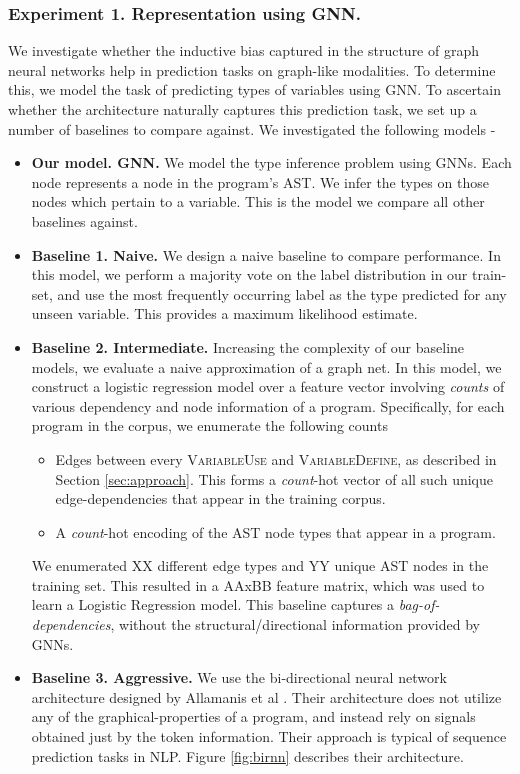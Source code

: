 \subsubsection{Experiment 1. Representation using GNN.}
We investigate whether the inductive bias captured in the structure of graph neural networks help in prediction tasks on graph-like modalities. To determine this, we model the task of predicting types of variables using GNN. To ascertain whether the architecture naturally captures this prediction task, we set up a number of baselines to compare against. We investigated the following models -
\begin{itemize}[noitemsep,topsep=0pt]
	\item \textbf{Our model. GNN.} We model the type inference problem using GNNs. Each node represents a node in the program's AST. We infer the types on those nodes which pertain to a variable. This is the model we compare all other baselines against.
	\item \textbf{Baseline 1. Naive.} We design a naive baseline to compare performance. In this model, we perform a majority vote on the label distribution in our train-set, and use the most frequently occurring label as the type predicted for any unseen variable. This provides a maximum likelihood estimate.
	\item \textbf{Baseline 2. Intermediate.} Increasing the complexity of our baseline models, we evaluate a naive approximation of a graph net. In this model, we construct a logistic regression model over a feature vector involving \textit{counts} of various dependency and node information of a program. Specifically, for each program in the corpus, we enumerate the following counts
	\begin{itemize}[noitemsep,topsep=0pt]
		\item Edges between every \textsc{VariableUse} and \textsc{VariableDefine}, as described in Section \ref{sec:approach}. This forms a \textit{count}-hot vector of all such unique edge-dependencies that appear in the training corpus.
		\item A  \textit{count}-hot encoding of the AST node types that appear in a program.
	\end{itemize}
	We enumerated XX different edge types and YY unique AST nodes in the training set. This resulted in a AAxBB feature matrix, which was used to learn a Logistic Regression model. This baseline captures a \textit{bag-of-dependencies}, without the structural/directional information provided by GNNs.
	\item \textbf{Baseline 3. Aggressive.} We use the bi-directional neural network architecture designed by Allamanis et al \cite{hellendoorn2018deep}. Their architecture does not utilize any of the graphical-properties of a program, and instead rely on signals obtained just by the token information. Their approach is typical of sequence prediction tasks in NLP. Figure \ref{fig:birnn} describes their architecture.
\end{itemize}
